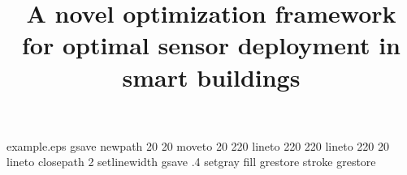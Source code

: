 %
%
%
%
%
\begin{filecontents*}{example.eps}
gsave
newpath
  20 20 moveto
  20 220 lineto
  220 220 lineto
  220 20 lineto
closepath
2 setlinewidth
gsave
  .4 setgray fill
grestore
stroke
grestore
\end{filecontents*}
%
\RequirePackage{fix-cm}
%
\documentclass[smallextended]{svjour3}       %
%
\smartqed  %
%
\usepackage{graphicx}

\usepackage{diagbox}
\usepackage{multirow}
\usepackage{comment}
\usepackage{xcolor}
\usepackage{amsmath}
\usepackage{natbib}
\usepackage{breakcites}

\newcolumntype{P}[1]{>{\centering\arraybackslash}m{#1}}


%
%
%
%
%


\title{  A novel optimization framework for optimal sensor deployment in smart buildings }
  

